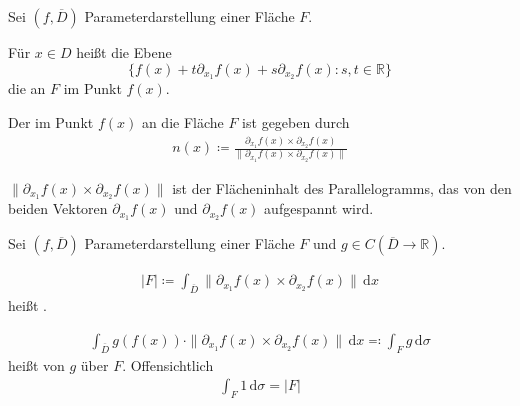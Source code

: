 \begin{theorem}[Definition]
  Sei $(f,\overline{D})$ Parameterdarstellung einer Fläche $F$.
  \begin{enum-arab}
    \item Für $x \in D$ heißt die Ebene \[ \{ f(x) + t \partial_{x_1} f(x) + s \partial_{x_2} f(x) : s,t \in \mathbb{R} \} \] die  an $F$ im Punkt $f(x)$.
    
    \item Der  im Punkt $f(x)$ an die Fläche $F$ ist gegeben durch
    \begin{align*}
      n(x) \coloneq \frac{\partial_{x_1} f(x) \times \partial_{x_2} f(x)}{\| \partial_{x_1} f(x) \times \partial_{x_2} f(x) \|}
    \end{align*}
  \end{enum-arab}
\end{theorem}

\begin{notice}
  $\| \partial_{x_1} f(x) \times \partial_{x_2} f(x) \|$ ist der Flächeninhalt des Parallelogramms, das von den beiden Vektoren $\partial_{x_1} f(x)$ und $\partial_{x_2} f(x)$ aufgespannt wird.
\end{notice}

\begin{theorem}[Definition]
  Sei $(f,\overline{D})$ Parameterdarstellung einer Fläche $F$ und $g \in C(\overline{D} \to \mathbb{R})$.
  \begin{enum-arab}
    \item
    \begin{align*}
      |F| \coloneq \int_{\overline{D}} \| \partial_{x_1} f(x) \times \partial_{x_2} f(x) \| \, \mathrm{d}x
    \end{align*}
    heißt .
    
    \item
    \begin{align*}
      \int_{\overline{D}} g(f(x)) \cdot \| \partial_{x_1} f(x) \times \partial_{x_2} f(x) \| \, \mathrm{d}x \eqcolon \int_F g \, \mathrm{d}\sigma
    \end{align*}
    heißt  von $g$ über $F$. Offensichtlich
    \begin{align*}
      \int_F 1 \, \mathrm{d}\sigma = |F|
    \end{align*}
  \end{enum-arab}
\end{theorem}

